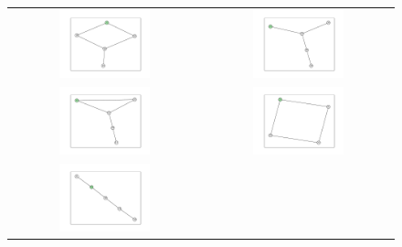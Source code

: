 \documentclass[12pt, a4paper]{extarticle}
\begin{document}
\begin{figure}[h!]\centering\begin{tabularx}{\textwidth}{cc}
\includegraphics[width=0.5\textwidth]{task11-graphlets/5_14-16-18-25-23.pdf} &
\includegraphics[width=0.5\textwidth]{task11-graphlets/5_10-16-25-23-26.pdf} \\
\includegraphics[width=0.5\textwidth]{task11-graphlets/5_21-17-25-20-23.pdf} &
\includegraphics[width=0.5\textwidth]{task11-graphlets/4_21-22-23-24.pdf} \\
\includegraphics[width=0.5\textwidth]{task11-graphlets/5_10-16-21-18-23.pdf} &

\end{tabularx}
\end{figure}
\end{document}
